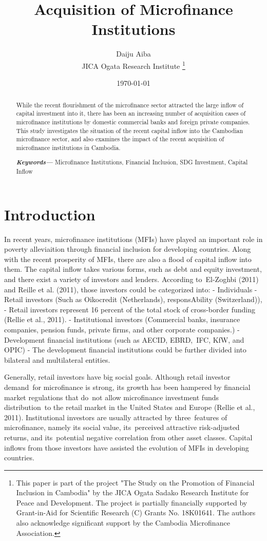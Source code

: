 \documentclass[a4j,12pt]{article}
\title{Acquisition of Microfinance Institutions}
\author{Daiju Aiba \\
        \small JICA Ogata Research Institute 
        \thanks{This paper is part of the project "The Study on the Promotion of Financial Inclusion in Cambodia" by the JICA Ogata Sadako Research Institute for Peace and Development. The project is partially financially supported by Grant-in-Aid for Scientific Research (C) Grants No. 18K01641. The authors also acknowledge significant support by the Cambodia Microfinance Association. }\\
}
\date{\today}
\providecommand{\keywords}[1]
{
  \small	
  \textbf{\textit{Keywords---}} #1
}
\begin{document}
\maketitle


\begin{abstract}
  While the recent flourishment of the microfinance sector attracted the large inflow of capital investment into it, there has been an increasing number of acquisition cases of microfinance institutions by domestic commercial banks and foreign private companies. This study investigates the situation of the recent capital inflow into the Cambodian microfinance sector, and also examines the impact of the recent acquisition of microfinance institutions in Cambodia. 
\keywords{Microfinance Institutions, Financial Inclusion, SDG Investment, Capital Inflow}
\end{abstract} 
  
\section{Introduction}

In recent years, microfinance institutions (MFIs) have played an important role in poverty alleviaition through financial inclusion for developing countries. Along with the recent prosperity of MFIs, there are also a flood of capital inflow into them. The capital inflow takes various forms, such as debt and equity investment, and there exist a variety of investors and lenders. According to El-Zoghbi (2011) and Reille et al. (2011), those investors could be categorized into:
- Individuals
- Retail investors (Such as Oikocredit (Netherlands), responsAbility (Switzerland)), 
	- Retail investors represent 16 percent of the total stock of cross-border funding (Rellie et al., 2011).
- Institutional investors (Commercial banks, insurance companies, pension funds, private  firms, and other corporate companies.)
- Development financial institutions (such as AECID, EBRD, IFC, KfW, and OPIC)      
    - The development financial institutions could be further divided into bilateral and multilateral entities.

 Generally, retail investors have big social goals. Although retail investor demand for microfinance is strong, its growth has been hampered by financial market regulations that do not allow microfinance investment funds distribution to the retail market in the United States and Europe (Rellie et al., 2011). Institutional investors are usually attracted by three features of microfinance, namely its social value, its perceived attractive risk-adjusted returns, and its potential negative correlation from other asset classes. Capital inflows from those investors have assisted the evolution of MFIs in developing countries.
\end{document}
